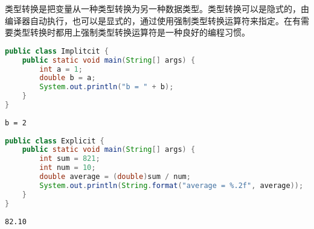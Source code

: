 类型转换是把变量从一种类型转换为另一种数据类型。类型转换可以是隐式的，由编译器自动执行，也可以是显式的，通过使用强制类型转换运算符来指定。在有需要类型转换时都用上强制类型转换运算符是一种良好的编程习惯。\\

\begin{lstlisting}[language=Java]
public class Implitcit {
	public static void main(String[] args) {
		int a = 1;
		double b = a;
		System.out.println("b = " + b);
	}
}
\end{lstlisting}

\begin{tcolorbox}
	\begin{verbatim}
b = 2
	\end{verbatim}
\end{tcolorbox}

\vspace{0.5cm}


\begin{lstlisting}[language=Java]
public class Explicit {
	public static void main(String[] args) {
		int sum = 821;
		int num = 10;
		double average = (double)sum / num;
		System.out.println(String.format("average = %.2f", average));
	}
}
\end{lstlisting}

\begin{tcolorbox}
	\begin{verbatim}
82.10
	\end{verbatim}
\end{tcolorbox}

\newpage